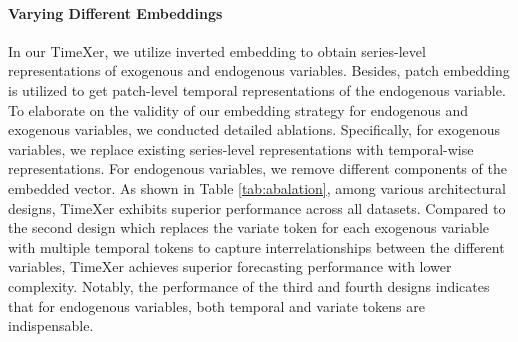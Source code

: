 \documentclass[nohyperref]{article}
\theoremstyle{plain}
\theoremstyle{definition}
\theoremstyle{remark}
\begin{document}
\paragraph{Varying Different Embeddings} In our TimeXer, we utilize inverted embedding to obtain series-level representations of exogenous and endogenous variables. Besides, patch embedding is utilized to get patch-level temporal representations of the endogenous variable.
To elaborate on the validity of our embedding strategy for endogenous and exogenous variables, we conducted detailed ablations. Specifically, for exogenous variables, we replace existing series-level representations with temporal-wise representations. For endogenous variables, we remove different components of the embedded vector. As shown in Table \ref{tab:abalation}, among various architectural designs, TimeXer exhibits superior performance across all datasets. Compared to the second design which replaces the variate token for each exogenous variable with multiple temporal tokens to capture interrelationships between the different variables, TimeXer achieves superior forecasting performance with lower complexity. Notably, the performance of the third and fourth designs indicates that for endogenous variables, both temporal and variate tokens are indispensable.
\end{document}
